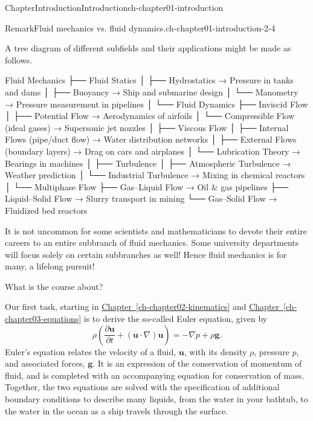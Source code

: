 \documentclass[oneside,10pt,]{book}
\newcommand{\xreffont}{\relax}
\numberwithin{equation}{section}
\newcommand{\pd}[2]{\frac{\partial#1}{\partial#2}}
\newcommand{\bu}{\boldsymbol{u}}
\newcommand{\bg}{\boldsymbol{g}}
\begin{document}
\begin{chapterptx}{Chapter}{Introduction}{}{Introduction}{}{}{ch-chapter01-introduction}
\begin{introduction}{}
\begin{remark}{Remark}{Fluid mechanics vs. fluid dynamics.}{ch-chapter01-introduction-2-4}
\par
A tree diagram of different subfields and their applications might be made as follows.%
\begin{preformatted}
Fluid Mechanics
 ├── Fluid Statics
 │     ├── Hydrostatics → Pressure in tanks and dams
 │     ├── Buoyancy → Ship and submarine design
 │     └── Manometry → Pressure measurement in pipelines
 │
 └── Fluid Dynamics
       ├── Inviscid Flow
       │     ├── Potential Flow → Aerodynamics of airfoils
       │     └── Compressible Flow (ideal gases) → Supersonic jet nozzles
       │
       ├── Viscous Flow
       │     ├── Internal Flows (pipe/duct flow) → Water distribution networks
       │     ├── External Flows (boundary layers) → Drag on cars and airplanes
       │     └── Lubrication Theory → Bearings in machines
       │
       ├── Turbulence
       │     ├── Atmospheric Turbulence → Weather prediction
       │     └── Industrial Turbulence → Mixing in chemical reactors
       │
       └── Multiphase Flow
             ├── Gas–Liquid Flow → Oil & gas pipelines
             ├── Liquid–Solid Flow → Slurry transport in mining
             └── Gas–Solid Flow → Fluidized bed reactors
\end{preformatted}
It is not uncommon for some scientists and mathematicians to devote their entire careers to an entire subbranch of fluid mechanics. Some university departments will focus solely on certain subbranches as well! Hence fluid mechanics is for many, a lifelong pursuit!%
\end{remark}
What is the course about?%
\par
Our first task, starting in \hyperref[ch-chapter02-kinematics]{Chapter~{\xreffont\ref{ch-chapter02-kinematics}}} and \hyperref[ch-chapter03-equations]{Chapter~{\xreffont\ref{ch-chapter03-equations}}} is to derive the so-called Euler equation, given by%
\begin{equation*}
\rho\left(\pd{\bu}{t} + (\bu \cdot \nabla)\bu\right) = -\nabla p + \rho\bg.
\end{equation*}
Euler's equation relates the velocity of a fluid, \(\bu\), with its density \(\rho\), pressure \(p\), and associated forces, \(\bg\). It is an expression of the conservation of momentum of fluid, and is completed with an accompanying equation for conservation of mass. Together, the two equations are solved with the specification of additional boundary conditions to describe many liquids, from the water in your bathtub, to the water in the ocean as a ship travels through the surface.%
\par

\end{introduction}
\end{chapterptx}
\end{document}
